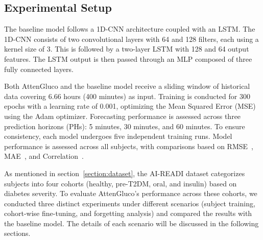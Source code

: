 \subsection{Experimental Setup}
The baseline model follows a 1D-CNN architecture coupled with an LSTM. The 1D-CNN consists of two convolutional layers with 64 and 128 filters, each using a kernel size of 3. This is followed by a two-layer LSTM with 128 and 64 output features. The LSTM output is then passed through an MLP composed of three fully connected layers. 

Both AttenGluco and the baseline model receive a sliding window of historical data covering 6.66 hours (400 minutes) as input. Training is conducted for 300 epochs with a learning rate of 0.001, optimizing the Mean Squared Error (MSE) using the Adam optimizer. Forecasting performance is assessed across three prediction horizons (PHs): 5 minutes, 30 minutes, and 60 minutes. To ensure consistency, each model undergoes five independent training runs. Model performance is assessed across all subjects, with comparisons based on RMSE~\cite{arefeen2023glysim}, MAE~\cite{arefeen2023glysim}, and Correlation~\cite{zhang2023joint}.

As mentioned in section~\ref{section:dataset}, the AI-READI dataset categorizes subjects into four cohorts (healthy, pre-T2DM, oral, and insulin) based on diabetes severity. To evaluate AttenGluco’s performance across these cohorts, we conducted three distinct experiments under different scenarios (subject training, cohort-wise fine-tuning, and forgetting analysis) and compared the results with the baseline model. The details of each scenario will be discussed in the following sections.

